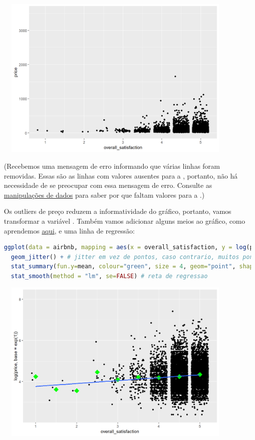 \documentclass{article}
\begin{document}
\begin{center}
\includegraphics[width=12cm,height=8cm]{modelling_linreg_scatterplot-1.png} 
\end{center}

(Recebemos uma mensagem de erro informando que várias linhas foram removidas. Essas são as linhas com valores ausentes para a , portanto, não há necessidade de se preocupar com essa mensagem de erro. Consulte as \href{https://bookdown.org/content/1340/data.html#modelling_manipulations}{manipulações de dados} para saber por que faltam valores para a .)


Os outliers de preço reduzem a informatividade do gráfico, portanto, vamos transformar a variável . Também vamos adicionar alguns meios ao gráfico, como aprendemos \href{https://bookdown.org/content/1340/graphs.html#graphs}{aqui}, e uma linha de regressão:

\begin{lstlisting}[language=R]
ggplot(data = airbnb, mapping = aes(x = overall_satisfaction, y = log(price, base = exp(1)))) +
  geom_jitter() + # jitter em vez de pontos, caso contrario, muitos pontos sao desenhados um sobre o outro
  stat_summary(fun.y=mean, colour="green", size = 4, geom="point", shape = 23, fill = "green") + # medias
  stat_smooth(method = "lm", se=FALSE) # reta de regressao
\end{lstlisting}

\begin{center}
\includegraphics[width=12cm,height=8cm]{modelling_linreg_scatterplot_transformed-1.png} 
\end{center}
\end{document}
